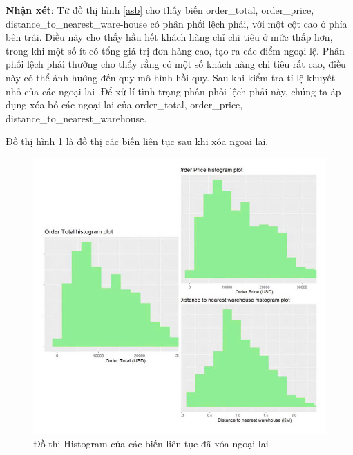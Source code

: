 \textbf{Nhận xét}: Từ đồ thị hình \ref{asb} cho thấy biến order\_total, order\_price, distance\_to\_nearest\_ware-house có phân phối lệch phải, với một cột cao ở phía bên trái. Điều này cho thấy hầu hết khách hàng chỉ chi tiêu ở mức thấp hơn, trong khi một số ít có tổng giá trị đơn hàng cao, tạo ra các điểm ngoại lệ. Phân phối lệch phải thường cho thấy  rằng có một số khách hàng chi tiêu rất cao, điều này có thể ảnh hưởng đến quy mô hình hồi quy. Sau khi kiểm tra tỉ lệ khuyết nhỏ của các ngoại lai .Để xử lí tình trạng phân phối lệch phải này, chúng ta áp dụng xóa bỏ các ngoại lai  của order\_total, order\_price, distance\_to\_nearest\_warehouse.


 Đồ thị hình \ref{abs} là đồ thị các biến liên tục sau khi xóa ngoại lai.
 \begin{figure}[H]
    \centering
    \includegraphics[width=0.7\linewidth]{graphics/bang8.jpg}
    \caption{Đồ thị Histogram của các biến liên tục đã xóa ngoại lai}
    \label{abs}
\end{figure}
